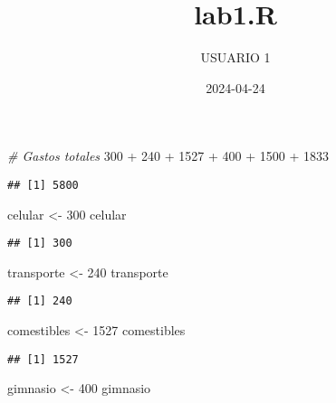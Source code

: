 \documentclass[
]{article}
\title{lab1.R}
\author{USUARIO 1}
\date{2024-04-24}
\newenvironment{Shaded}{\begin{snugshade}}{\end{snugshade}}
\newcommand{\CommentTok}[1]{\textcolor[rgb]{0.56,0.35,0.01}{\textit{#1}}}
\newcommand{\DecValTok}[1]{\textcolor[rgb]{0.00,0.00,0.81}{#1}}
\newcommand{\NormalTok}[1]{#1}
\newcommand{\OtherTok}[1]{\textcolor[rgb]{0.56,0.35,0.01}{#1}}
\newcommand{\SpecialCharTok}[1]{\textcolor[rgb]{0.00,0.00,0.00}{#1}}
\begin{document}
\maketitle

\begin{Shaded}
\begin{Highlighting}[]
\CommentTok{\# Gastos totales}
\DecValTok{300} \SpecialCharTok{+} \DecValTok{240} \SpecialCharTok{+} \DecValTok{1527} \SpecialCharTok{+} \DecValTok{400} \SpecialCharTok{+} \DecValTok{1500} \SpecialCharTok{+} \DecValTok{1833}
\end{Highlighting}
\end{Shaded}

\begin{verbatim}
## [1] 5800
\end{verbatim}

\begin{Shaded}
\begin{Highlighting}[]
\NormalTok{celular }\OtherTok{\textless{}{-}} \DecValTok{300}
\NormalTok{celular }
\end{Highlighting}
\end{Shaded}

\begin{verbatim}
## [1] 300
\end{verbatim}

\begin{Shaded}
\begin{Highlighting}[]
\NormalTok{transporte }\OtherTok{\textless{}{-}} \DecValTok{240}
\NormalTok{transporte }
\end{Highlighting}
\end{Shaded}

\begin{verbatim}
## [1] 240
\end{verbatim}

\begin{Shaded}
\begin{Highlighting}[]
\NormalTok{comestibles }\OtherTok{\textless{}{-}} \DecValTok{1527}
\NormalTok{comestibles}
\end{Highlighting}
\end{Shaded}

\begin{verbatim}
## [1] 1527
\end{verbatim}

\begin{Shaded}
\begin{Highlighting}[]
\NormalTok{gimnasio }\OtherTok{\textless{}{-}} \DecValTok{400} 
\NormalTok{gimnasio }
\end{Highlighting}
\end{Shaded}
\end{document}
